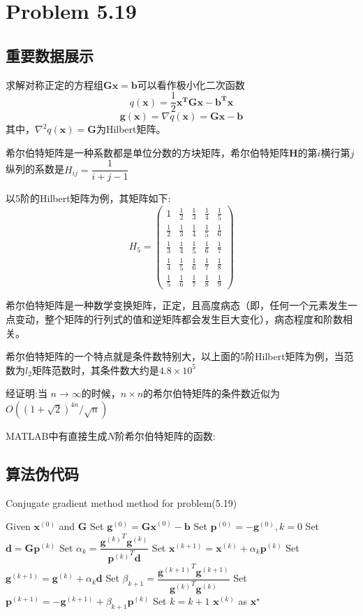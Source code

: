 \newpage
\section{Problem 5.19}
\subsection{重要数据展示}
求解对称正定的方程组$\bm{Gx}=\bm{b}$可以看作极小化二次函数\[q(\bm{x})=\dfrac{1}{2}\bm{x^TGx-b^Tx}\]
\[\bm{g}(\bm{x})=\nabla q(\bm{x})=\bm{Gx}-\bm{b}\]
其中，$\nabla^2 q(\bm{x})=\bm{G}$为Hilbert矩阵。

希尔伯特矩阵是一种系数都是单位分数的方块矩阵，希尔伯特矩阵$\bm{H}$的第$i$横行第$j$纵列的系数是$H_{{ij}}={\dfrac  {1}{i+j-1}}$

以5阶的Hilbert矩阵为例，其矩阵如下:
\[H_5=\left(\begin{array}{ccccc} 1 & \frac{1}{2} & \frac{1}{3} & \frac{1}{4} & \frac{1}{5}\\ \frac{1}{2} & \frac{1}{3} & \frac{1}{4} & \frac{1}{5} & \frac{1}{6}\\ \frac{1}{3} & \frac{1}{4} & \frac{1}{5} & \frac{1}{6} & \frac{1}{7}\\ \frac{1}{4} & \frac{1}{5} & \frac{1}{6} & \frac{1}{7} & \frac{1}{8}\\ \frac{1}{5} & \frac{1}{6} & \frac{1}{7} & \frac{1}{8} & \frac{1}{9} \end{array}\right)\]

希尔伯特矩阵是一种数学变换矩阵，正定，且高度病态（即，任何一个元素发生一点变动，整个矩阵的行列式的值和逆矩阵都会发生巨大变化），病态程度和阶数相关。

希尔伯特矩阵的一个特点就是条件数特别大，以上面的5阶Hilbert矩阵为例，当范数为$l_2$矩阵范数时，其条件数大约是$4.8\times 10^{5}$

经证明:当 $ n\rightarrow \infty$的时候，$ n\times n$的希尔伯特矩阵的条件数近似为$O((1+{\sqrt  {2}})^{{4n}}/{\sqrt  {n}})$

MATLAB中有直接生成$N$阶希尔伯特矩阵的函数:

\newpage
\subsection{算法伪代码}
\begin{algorithm}[h]  
\caption{Conjugate gradient method method for problem(5.19)}  
\begin{algorithmic}[1]  
\STATE Given $\bm{x}^{(0)}$  and $\bm{G}$
\STATE Set $\bm{g}^{(0)}=\bm{Gx}^{(0)}-\bm{b}$
\STATE Set $\bm{p}^{(0)}=-\bm{g}^{(0)},k=0$
\STATE Set $\bm{d}=\bm{G}\bm{p}^{(k)}$
\STATE Set $\alpha_k=\dfrac{{\bm{g}^{(k)}}^T\bm{g}^{(k)}}{{\bm{p}^{(k)}}^T\bm{d}}$
\STATE Set $\bm{x}^{(k+1)}=\bm{x}^{(k)}+\alpha_k\bm{p}^{(k)}$
\STATE Set $\bm{g}^{(k+1)}=\bm{g}^{(k)}+\alpha_k\bm{d}$
\STATE Set $\beta_{k+1}=\dfrac{{\bm{g}^{(k+1)}}^T\bm{g}^{(k+1)}}{{\bm{g}^{(k)}}^T{\bm{g}^{(k)}}}$
\STATE Set $\bm{p}^{(k+1)}=-\bm{g}^{(k+1)}+\beta_{k+1}\bm{p}^{(k)}$
\STATE Set $k=k+1$
\ENDWHILE
\RETURN $\bm{x}^{(k)}$ as $\bm{x}^{\star}$
\end{algorithmic}  
\end{algorithm}

